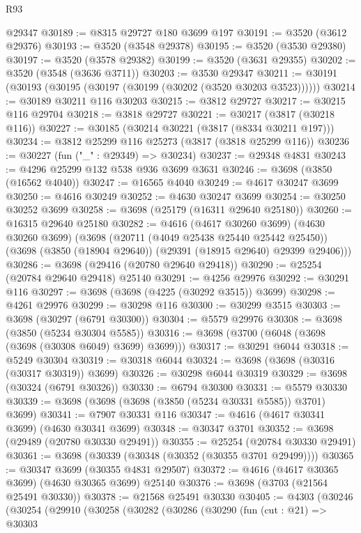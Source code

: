 \begin{lexlean}{R93}
\begin{coremodule}
    @29347
@30189 := @8315 @29727 @180 @3699 @197
@30191 := @3520 (@3612 @29376)
@30193 := @3520 (@3548 @29378)
@30195 := @3520 (@3530 @29380)
@30197 := @3520 (@3578 @29382)
@30199 := @3520 (@3631 @29355)
@30202 := @3520 (@3548 (@3636 @3711))
@30203 := @3530 @29347
@30211 := @30191 (@30193 (@30195 (@30197 (@30199 (@30202 (@3520 @30203 @3523))))))
@30214 := @30189 @30211 @116 @30203
@30215 := @3812 @29727
@30217 := @30215 @116 @29704
@30218 := @3818 @29727
@30221 := @30217 (@3817 (@30218 @116))
@30227 := @30185 (@30214 @30221 (@3817 (@8334 @30211 @197)))
@30234 := @3812 @25299 @116 @25273 (@3817 (@3818 @25299 @116))
@30236 := @30227 (fun ("_" : @29349) => @30234)
@30237 := @29348 @4831
@30243 := @4296 @25299 @132 @538 @936 @3699 @3631
@30246 := @3698 (@3850 (@16562 @4040))
@30247 := @16565 @4040
@30249 := @4617 @30247 @3699
@30250 := @4616 @30249
@30252 := @4630 @30247 @3699
@30254 := @30250 @30252 @3699
@30258 := @3698 (@25179 (@16311 @29640 @25180))
@30260 := @16315 @29640 @25180
@30282 := @4616
    (@4617 @30260 @3699)
    (@4630 @30260 @3699)
    (@3698
      (@20711 (@4049 @25438 @25440 @25442 @25450))
      (@3698 (@3850 (@18904 @29640)) (@29391 (@18915 @29640) @29399 @29406)))
@30286 := @3698 (@29416 (@20780 @29640 @29418))
@30290 := @25254 (@20784 @29640 @29418) @25140
@30291 := @4256 @29976
@30292 := @30291 @116
@30297 := @3698 (@3698 (@4225 (@30292 @3515)) @3699)
@30298 := @4261 @29976
@30299 := @30298 @116
@30300 := @30299 @3515
@30303 := @3698 (@30297 (@6791 @30300))
@30304 := @5579 @29976
@30308 := @3698 (@3850 (@5234 @30304 @5585))
@30316 := @3698 (@3700 (@6048 (@3698 (@3698 (@30308 @6049) @3699) @3699)))
@30317 := @30291 @6044
@30318 := @5249 @30304
@30319 := @30318 @6044
@30324 := @3698 (@3698 (@30316 (@30317 @30319)) @3699)
@30326 := @30298 @6044 @30319
@30329 := @3698 (@30324 (@6791 @30326))
@30330 := @6794 @30300
@30331 := @5579 @30330
@30339 := @3698 (@3698 (@3698 (@3850 (@5234 @30331 @5585)) @3701) @3699)
@30341 := @7907 @30331 @116
@30347 := @4616 (@4617 @30341 @3699) (@4630 @30341 @3699)
@30348 := @30347 @3701
@30352 := @3698 (@29489 (@20780 @30330 @29491))
@30355 := @25254 (@20784 @30330 @29491)
@30361 := @3698 (@30339 (@30348 (@30352 (@30355 @3701 @29499))))
@30365 := @30347 @3699 (@30355 @4831 @29507)
@30372 := @4616 (@4617 @30365 @3699) (@4630 @30365 @3699) @25140
@30376 := @3698 (@3703 (@21564 @25491 @30330))
@30378 := @21568 @25491 @30330
@30405 := @4303
    (@30246
      (@30254
        (@29910
          (@30258
            (@30282
              (@30286
                (@30290
                  (fun (cut : @21) =>
                  @30303

\end{coremodule}
\end{lexlean}
